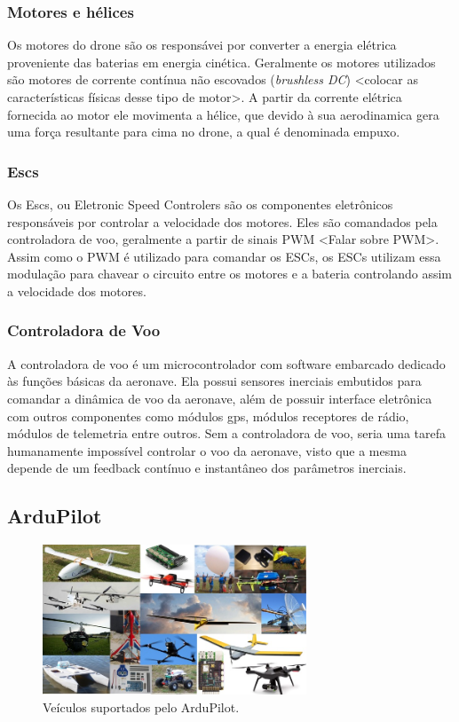 \documentclass[12pt,a4paper,oneside]{book}
\begin{document}
\subsubsection*{Motores e hélices}

Os motores do drone são os responsávei por converter a energia elétrica proveniente das baterias em energia cinética. Geralmente os 
motores utilizados são motores de corrente contínua não escovados (\textit{brushless DC}) <colocar as características físicas desse tipo de motor>.
A partir da corrente elétrica fornecida ao motor ele movimenta a hélice, que devido à sua aerodinamica gera uma força resultante para cima no drone,
a qual é denominada empuxo. 

\subsubsection*{Escs}

Os Escs, ou Eletronic Speed Controlers são os componentes eletrônicos responsáveis por controlar a velocidade dos motores.
Eles são comandados pela controladora de voo, geralmente a partir de sinais PWM <Falar sobre PWM>. Assim como o PWM é utilizado para comandar 
os ESCs, os ESCs utilizam essa modulação para chavear o circuito entre os motores e a bateria controlando assim a velocidade dos motores. 

\subsubsection*{Controladora de Voo}

A controladora de voo é um microcontrolador com software embarcado dedicado às funções básicas da aeronave. Ela possui sensores 
inerciais embutidos para comandar a dinâmica de voo da aeronave, além de possuir interface eletrônica com outros componentes como módulos gps, módulos receptores de rádio, módulos de telemetria entre outros. Sem a controladora de voo, seria uma tarefa humanamente impossível controlar o voo da aeronave, visto que a mesma depende de um feedback contínuo e instantâneo dos parâmetros inerciais. 

\subsection{ArduPilot}

%
\begin{figure}[!htbp]
  \centering
  \includegraphics[width=0.7\textwidth]{Images/introducao/ardupilot_vehicles.jpg}
  \caption{Veículos suportados pelo ArduPilot.}
  \label{fig:ardupilot_vehicles.jpg.0}
\end{figure}
%
\end{document}
